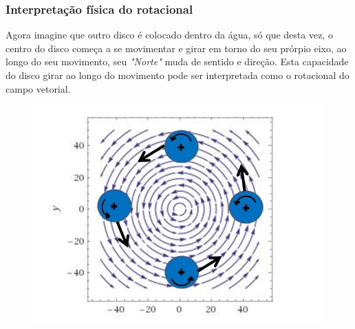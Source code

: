 \begin{frame}
    \frametitle{Interpretação física do rotacional}
    \justifying
    Agora imagine que outro disco é colocado dentro da água, só que desta vez, o centro do disco começa a se movimentar e girar em torno do seu prórpio eixo, ao longo do seu movimento, seu \textit{"Norte"} muda de sentido e direção. Esta capacidade do disco girar ao longo do movimento pode ser interpretada como o rotacional do campo vetorial.
    
    \begin{figure}[h]
        \centering
        \includegraphics[scale=0.4]{img/Campo_Vetorial_com_Disco_Girando.jpg}
    \end{figure}
\end{frame}

